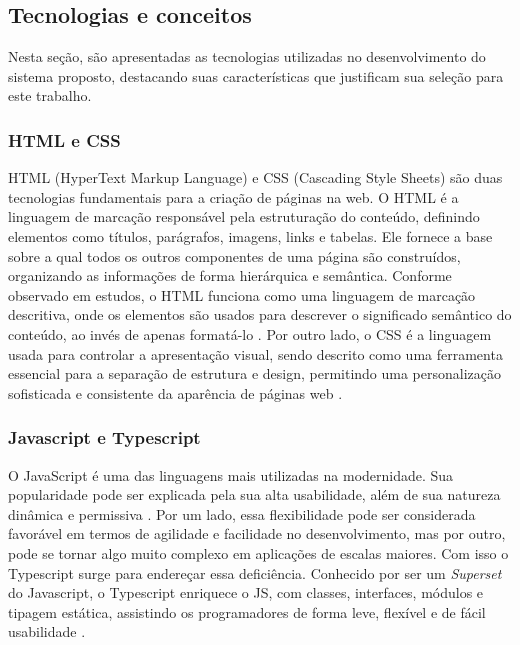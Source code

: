 \subsection{Tecnologias e conceitos}

Nesta seção, são apresentadas as tecnologias utilizadas no desenvolvimento do sistema proposto, destacando suas características que justificam sua seleção para este trabalho.

\subsubsection{HTML e CSS}

HTML (HyperText Markup Language) e CSS (Cascading Style Sheets) são duas tecnologias fundamentais para a criação de páginas na web. O HTML é a linguagem de marcação responsável pela estruturação do conteúdo, definindo elementos como títulos, parágrafos, imagens, links e tabelas. Ele fornece a base sobre a qual todos os outros componentes de uma página são construídos, organizando as informações de forma hierárquica e semântica. Conforme observado em estudos, o HTML funciona como uma linguagem de marcação descritiva, onde os elementos são usados para descrever o significado semântico do conteúdo, ao invés de apenas formatá-lo \cite{bernard2005html}. Por outro lado, o CSS é a linguagem usada para controlar a apresentação visual, sendo descrito como uma ferramenta essencial para a separação de estrutura e design, permitindo uma personalização sofisticada e consistente da aparência de páginas web \cite{smith2008css}.

\subsubsection{Javascript e Typescript}

O JavaScript é uma das linguagens mais utilizadas na modernidade. Sua popularidade pode ser explicada pela sua alta usabilidade, além de sua natureza dinâmica e permissiva \cite{andreasen2017survey}. Por um lado, essa flexibilidade pode ser considerada favorável em termos de agilidade e facilidade no desenvolvimento, mas por outro, pode se tornar algo muito complexo em aplicações de escalas maiores. Com isso o Typescript surge para endereçar essa deficiência. Conhecido por ser um \textit{Superset} do Javascript, o Typescript enriquece o JS, com classes, interfaces, módulos e tipagem estática, assistindo os programadores de forma leve, flexível e de fácil usabilidade \cite{bierman2014understanding}.


